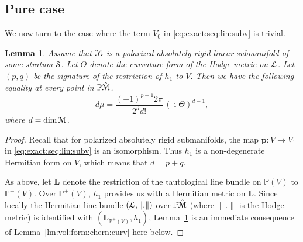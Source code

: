 \documentclass[11pt]{article}
\numberwithin{equation}{section}
\let\mathcal\EuScript
\theoremstyle{plain}
\newtheorem{Lemma}[Theorem]{Lemma}
\theoremstyle{definition}
\newcommand{\Pb}{\mathbb{P}}
\newcommand{\Lb}{\mathbf{L}}
\newcommand{\pp}{\boldsymbol{p}}
\newcommand{\cL}{\mathcal{L}}
\newcommand{\cM}{\mathcal{M}}
\newcommand{\cS}{\mathcal{S}}
\begin{document}
\subsection{Pure case}\label{sec:vol:form:pure}
We now turn to the case where the term $V_0$ in \eqref{eq:exact:seq:lin:subv} is trivial.
\begin{Lemma}\label{lm:vol:form:n:Chern:cl}
Assume that $\cM$ is a polarized absolutely rigid linear submanifold of some stratum $\cS$.
Let $\Theta$ denote the curvature form of the Hodge metric on $\cL$.
Let $(p,q)$ be the signature of the restriction of $h_1$ to $V$.
Then we have the following equality at every point in $\Pb\hat{\cM}$.
\[ d\mu=\frac{(-1)^{p-1}2\pi}{2^dd!}\,(\imath\Theta)^{d-1},\]
where $d=\dim\cM$.
\end{Lemma}
\begin{proof}
Recall that for polarized absolutely rigid submanifolds, the map $\pp:V \to V_1$ in \eqref{eq:exact:seq:lin:subv} is an isomorphism.
Thus $h_1$ is a non-degenerate Hermitian form on $V$, which means that $d=p+q$.

As above, let $\Lb$ denote the restriction of the tautological line bundle on $\Pb(V)$ to $\Pb^+(V)$. Over $\Pb^+(V)$, $h_1$ provides us with a Hermitian metric on $\Lb$.
Since locally the Hermitian line bundle $(\cL,\|.\|)$ over $\Pb\hat{\cM}$ (where $\|.\|$ is the Hodge metric) is identified with $(\Lb_{\Pb^+(V)},h_1)$, Lemma~\ref{lm:vol:form:n:Chern:cl} is an immediate consequence of Lemma~\ref{lm:vol:form:chern:curv} here below.
\end{proof}
\end{document}
